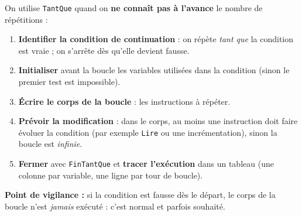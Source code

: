 \documentclass[11pt]{article}
\begin{document}
\begin{methode}
On utilise \texttt{TantQue} quand on \textbf{ne connaît pas à l'avance} le nombre de répétitions :
\begin{enumerate}
\item \textbf{Identifier la condition de continuation} : on répète \emph{tant que} la condition est vraie ; on s'arrête dès qu'elle devient fausse.
\item \textbf{Initialiser} avant la boucle les variables utilisées dans la condition (sinon le premier test est impossible).
\item \textbf{Écrire le corps de la boucle} : les instructions à répéter.
\item \textbf{Prévoir la modification} : dans le corps, au moins une instruction doit faire évoluer la condition (par exemple \texttt{Lire} ou une incrémentation), sinon la boucle est \emph{infinie}.
\item \textbf{Fermer} avec \texttt{FinTantQue} et \textbf{tracer l'exécution} dans un tableau (une colonne par variable, une ligne par tour de boucle).
\end{enumerate}
\textbf{Point de vigilance :} si la condition est fausse dès le départ, le corps de la boucle n'est \emph{jamais} exécuté : c'est normal et parfois souhaité.
\end{methode}
\end{document}
